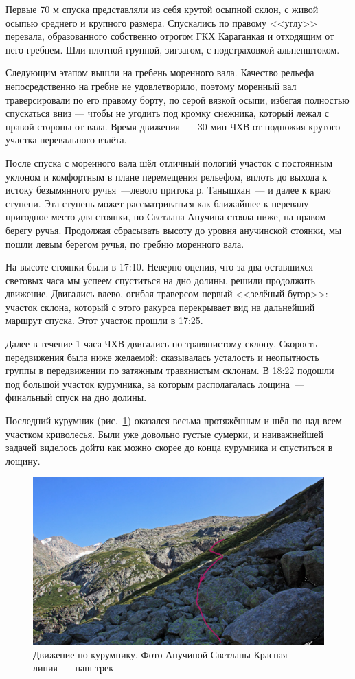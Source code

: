 Первые 70 м спуска представляли из себя крутой осыпной склон, с живой осыпью среднего и крупного размера. Спускались по правому <<углу>> перевала, образованного собственно отрогом ГКХ Караганкая и отходящим от него гребнем. Шли плотной группой, зигзагом, с подстраховкой альпенштоком.  

Следующим этапом вышли на гребень моренного вала. Качество рельефа непосредственно на гребне не удовлетворило, поэтому моренный вал траверсировали по его правому борту, по серой вязкой осыпи, избегая полностью спускаться вниз --- чтобы не угодить под кромку снежника, который лежал с правой стороны от вала. Время движения~--- 30 мин ЧХВ от подножия крутого участка перевального взлёта.

После спуска с моренного вала шёл отличный пологий участок с постоянным уклоном и комфортным в плане перемещения рельефом, вплоть до выхода к истоку безымянного ручья~---левого притока р. Танышхан~--- и далее к краю ступени. Эта ступень может рассматриваться как ближайшее к перевалу пригодное место для стоянки, но Светлана Анучина стояла ниже, на правом берегу ручья. Продолжая сбрасывать высоту до уровня анучинской стоянки, мы пошли левым берегом ручья, по гребню моренного вала. 

На высоте стоянки были в 17:10. Неверно оценив, что за два оставшихся световых часа мы успеем спуститься на дно долины, решили продолжить движение. Двигались влево, огибая траверсом первый <<зелёный бугор>>: участок склона, который с этого ракурса перекрывает вид на дальнейший маршрут спуска. Этот участок прошли в 17:25. 

Далее в течение 1 часа ЧХВ двигались по травянистому склону. Скорость передвижения была ниже желаемой: сказывалась усталость и неопытность группы в передвижении по затяжным травянистым склонам. В 18:22 подошли под большой участок курумника, за которым располагалась лощина~--- финальный спуск на дно долины.

Последний курумник (рис.~\ref{fig:peremkurum}) оказался весьма протяжённым и шёл по-над всем участком криволесья. Были уже довольно густые сумерки, и наиважнейшей задачей виделось дойти как можно скорее до конца курумника и спуститься в лощину. 
\begin{figure}[h!]
	\centering
	\includegraphics[width=0.7\linewidth]{../pics/peremkurum.png}
	\caption{Движение по курумнику. Фото Анучиной Светланы Красная линия~--- наш трек}
	\label{fig:peremkurum}
\end{figure} 

